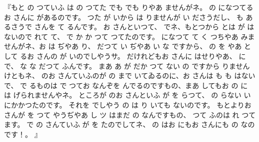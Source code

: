 『もと
の
つていふ
は
の
つてた
でも
でも
りやあ
ませんがネ。
の
になつてるお
さんに
があるのです。
つた
が
いから
は
りませんが
い
ださうだし、
も
あるさうで
さんを
て
るんです。
お
さんといつて、
でネ、もとつから
とは
が
はないので
れて
て、
で
か
か
つて
つてたのです。
になつて
て
く
つちやあ
みませんがネ、お
は
ぢやあ
り、
だつて
い
ぢやあ
い
な
ですから、
の
を
やあ
として
るお
さんの
が
いのでしやうサ。
だけれどもお
さんに
はせりやあ、
に
で、
な
な
だつて
ふんです。
まあ
あ
が
だか
つて
ない
の
ですから
りませんけともネ、
のお
さんていふのが
の
まで
いてゐるのに、お
さんは
も
も
はないで、
で
るものは
で
つてお
なんぞを
んでるのですもの、まあ
してもお
の
に
は
げられませんやネ。
ところが
のお
さんといふ
が
を
らつて、
の
らない
い
にかかつたのです。
それを
でしやう
の
は
り
いても
ないのです。
もとよりお
さんが
を
つて
やうぢやあ
し
ツ
はまだ
の
なんですもの、
つて
ふのは
れ
つて
ます。
で
の
さんていふ
が
を
たのでしてネ、
の
はお
にもお
さんにも
の
なのです！。
』

